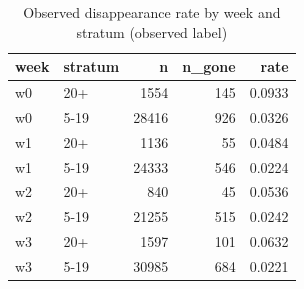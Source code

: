 \begin{table}
\caption{Observed disappearance rate by week and stratum (observed label)}
\label{tab:tab_followup_by_week_final}
\begin{tabular}{llrrr}
\toprule
week & stratum & n & n\_gone & rate \\
\midrule
w0 & 20+ & 1554 & 145 & 0.0933 \\
w0 & 5-19 & 28416 & 926 & 0.0326 \\
w1 & 20+ & 1136 & 55 & 0.0484 \\
w1 & 5-19 & 24333 & 546 & 0.0224 \\
w2 & 20+ & 840 & 45 & 0.0536 \\
w2 & 5-19 & 21255 & 515 & 0.0242 \\
w3 & 20+ & 1597 & 101 & 0.0632 \\
w3 & 5-19 & 30985 & 684 & 0.0221 \\
\bottomrule
\end{tabular}
\end{table}
